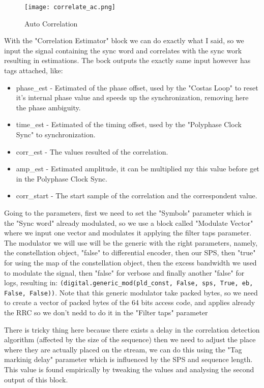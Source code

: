 \documentclass[a4paper, 10pt, conference]{ieeeconf}      %
\begin{document}
     \begin{figure}
        \centering
        \texttt{[image: correlate\_ac.png]}
        \caption{Auto Correlation}
        \label{correlate_ac.png}
    \end{figure}
     

    With the "Correlation Estimator" block we can do exactly what I said, so we input the signal containing the sync word and correlates with the sync work resulting in estimations. The bock outputs the exactly same input however has tags attached, like:
    \begin{itemize}
    \item phase\_est - Estimated of the phase offset, used by the "Costas Loop" to reset it's internal phase value and speeds up the synchronization, removing here the phase ambiguity.
    \item time\_est - Estimated of the timing offset, used by the "Polyphase Clock Sync" to synchronization.
    \item corr\_est - The values resulted of the correlation.
    \item amp\_est - Estimated amplitude, it can be multiplied my this value before get in the Polyphase Clock Sync.
    \item corr\_start - The start sample of the correlation and the correspondent value.
    \end{itemize}
    
    Going to the parameters, first we need to set the "Symbols" parameter which is the "Sync word" already modulated, so we use a block called "Modulate Vector" where we input one vector and modulates it applying the filter taps parameter. The modulator we will use will be the generic with the right parameters, namely, the constellation object, "false" to differential encoder, then our SPS, then "true" for using the map of the constellation object, then the excess bandwidth we used to modulate the signal, then "false" for verbose and finally another "false" for logs, resulting in:  \texttt{(digital.generic\_mod(pld\_const, False, sps, True, eb, False, False))}. Note that this generic modulator take packed bytes, so we need to create a vector of packed bytes of the 64 bits access code, and applies already the RRC so we don't nedd to do it in the "Filter taps" parameter 
    
    There is tricky thing here because there exists a delay in the correlation detection algorithm (affected by the size of the sequence) then we need to adjust the place where they are actually placed on the stream, we can do this using the "Tag markinig delay" parameter which is influenced by the SPS and sequence length. This value is found empirically by tweaking the values and analysing the second output of this block.
    
\end{document}

